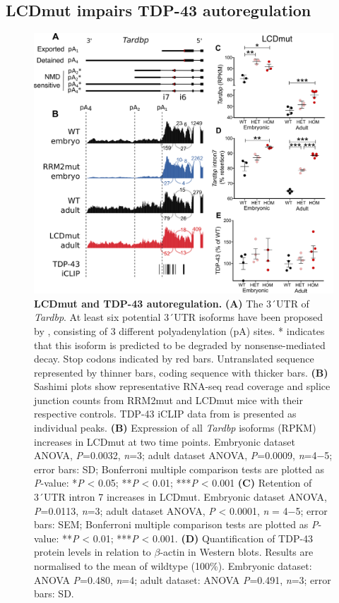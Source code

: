 \subsection{LCDmut impairs TDP-43 autoregulation}

\begin{figure}[h!]
	\centering
	\includegraphics[width=\textwidth]{Figures/05_tdp_mice/autoregulation.png}
	\caption[LCDmut and TDP-43 autoregulation]{
		\textbf{LCDmut and TDP-43 autoregulation.}
	\textbf{(A)} The 3\'\ UTR of \textit{Tardbp}. At least six potential 3\'\ UTR isoforms have been proposed by \citep{Koyama2016}, consisting of 3 different polyadenylation (pA) sites. * indicates that this isoform is predicted to be degraded by nonsense-mediated decay. Stop codons indicated by red bars. Untranslated sequence represented by thinner bars, coding sequence with thicker bars.
	\textbf{(B)} Sashimi plots show representative RNA-seq read coverage and splice junction counts from RRM2mut and LCDmut mice with their respective controls. TDP-43 iCLIP data from \citep{Rogelj2012} is presented as individual peaks.
	\textbf{(B)} Expression of all \textit{Tardbp} isoforms (RPKM) increases in LCDmut at two time points.  Embryonic dataset ANOVA, \textit{P}=0.0032, \textit{n}=3; adult dataset ANOVA, \textit{P}=0.0009, \textit{n}=4$-$5; error bars: SD; Bonferroni multiple comparison tests are plotted as \textit{P}-value: *\textit{P} < 0.05; **\textit{P} < 0.01; ***\textit{P} < 0.001
	\textbf{(C)} Retention of 3\'\ UTR intron 7 increases in LCDmut. Embryonic dataset ANOVA, \textit{P}=0.0113, \textit{n}=3; adult dataset ANOVA, \textit{P} < 0.0001, \textit{n} = 4$-$5; error bars: SEM; Bonferroni multiple comparison tests are plotted as \textit{P}-value: **\textit{P} < 0.01; ***\textit{P} < 0.001.
	\textbf{(D)} Quantification of TDP-43 protein levels in relation to $\beta$-actin in Western blots. Results are normalised to the mean of wildtype (100\%). Embryonic dataset: ANOVA \textit{P}=0.480, \textit{n}=4; adult dataset: ANOVA \textit{P}=0.491, \textit{n}=3; error bars: SD.
}
	\label{fig:autoregulation}
\end{figure}

